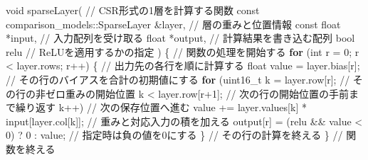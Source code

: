 \documentclass[
  10pt,
  a4paper,
]{article}
\newenvironment{Shaded}{}{}
\newcommand{\AttributeTok}[1]{\textcolor[rgb]{0.49,0.56,0.16}{#1}}
\newcommand{\CommentTok}[1]{\textcolor[rgb]{0.38,0.63,0.69}{\textit{#1}}}
\newcommand{\ControlFlowTok}[1]{\textcolor[rgb]{0.00,0.44,0.13}{\textbf{#1}}}
\newcommand{\DataTypeTok}[1]{\textcolor[rgb]{0.56,0.13,0.00}{#1}}
\newcommand{\DecValTok}[1]{\textcolor[rgb]{0.25,0.63,0.44}{#1}}
\newcommand{\NormalTok}[1]{#1}
\newcommand{\OperatorTok}[1]{\textcolor[rgb]{0.40,0.40,0.40}{#1}}
\renewcommand{\CommentTok}[1]{\textcolor[rgb]{0.25,0.25,0.25}{#1}}
\begin{document}
\begin{Shaded}
\begin{Highlighting}[]
\DataTypeTok{void}\NormalTok{ sparseLayer}\OperatorTok{(} \CommentTok{// CSR形式の1層を計算する関数}
  \AttributeTok{const}\NormalTok{ comparison\_models}\OperatorTok{::}\NormalTok{SparseLayer }\OperatorTok{\&}\NormalTok{layer}\OperatorTok{,} \CommentTok{// 層の重みと位置情報}
  \AttributeTok{const} \DataTypeTok{float} \OperatorTok{*}\NormalTok{input}\OperatorTok{,} \CommentTok{// 入力配列を受け取る}
  \DataTypeTok{float} \OperatorTok{*}\NormalTok{output}\OperatorTok{,} \CommentTok{// 計算結果を書き込む配列}
  \DataTypeTok{bool}\NormalTok{ relu }\CommentTok{// ReLUを適用するかの指定}
\OperatorTok{)} \OperatorTok{\{} \CommentTok{// 関数の処理を開始する}
  \ControlFlowTok{for} \OperatorTok{(}\DataTypeTok{int}\NormalTok{ r }\OperatorTok{=} \DecValTok{0}\OperatorTok{;}\NormalTok{ r }\OperatorTok{\textless{}}\NormalTok{ layer}\OperatorTok{.}\NormalTok{rows}\OperatorTok{;}\NormalTok{ r}\OperatorTok{++)} \OperatorTok{\{} \CommentTok{// 出力先の各行を順に計算する}
    \DataTypeTok{float}\NormalTok{ value }\OperatorTok{=}\NormalTok{ layer}\OperatorTok{.}\NormalTok{bias}\OperatorTok{[}\NormalTok{r}\OperatorTok{];} \CommentTok{// その行のバイアスを合計の初期値にする}
    \ControlFlowTok{for} \OperatorTok{(}\DataTypeTok{uint16\_t}\NormalTok{ k }\OperatorTok{=}\NormalTok{ layer}\OperatorTok{.}\NormalTok{row}\OperatorTok{[}\NormalTok{r}\OperatorTok{];} \CommentTok{// その行の非ゼロ重みの開始位置}
\NormalTok{         k }\OperatorTok{\textless{}}\NormalTok{ layer}\OperatorTok{.}\NormalTok{row}\OperatorTok{[}\NormalTok{r}\OperatorTok{+}\DecValTok{1}\OperatorTok{];} \CommentTok{// 次の行の開始位置の手前まで繰り返す}
\NormalTok{         k}\OperatorTok{++)} \CommentTok{// 次の保存位置へ進む}
\NormalTok{      value }\OperatorTok{+=}\NormalTok{ layer}\OperatorTok{.}\NormalTok{values}\OperatorTok{[}\NormalTok{k}\OperatorTok{]} \OperatorTok{*}\NormalTok{ input}\OperatorTok{[}\NormalTok{layer}\OperatorTok{.}\NormalTok{col}\OperatorTok{[}\NormalTok{k}\OperatorTok{]];} \CommentTok{// 重みと対応入力の積を加える}
\NormalTok{    output}\OperatorTok{[}\NormalTok{r}\OperatorTok{]} \OperatorTok{=} \OperatorTok{(}\NormalTok{relu }\OperatorTok{\&\&}\NormalTok{ value }\OperatorTok{\textless{}} \DecValTok{0}\OperatorTok{)} \OperatorTok{?} \DecValTok{0} \OperatorTok{:}\NormalTok{ value}\OperatorTok{;} \CommentTok{// 指定時は負の値を0にする}
  \OperatorTok{\}} \CommentTok{// その行の計算を終える}
\OperatorTok{\}} \CommentTok{// 関数を終える}
\end{Highlighting}
\end{Shaded}
\end{document}
